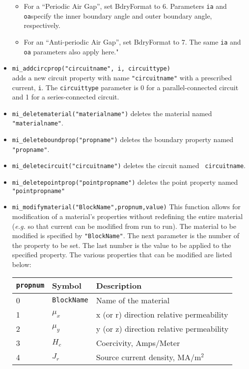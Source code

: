 \begin{itemize}
\begin{itemize}
        \item  For a ``Periodic Air Gap'', set BdryFormat to 6. Parameters {\tt ia} and {\tt oa}specify the inner boundary angle and outer boundary angle, respectively.

        \item  For an ``Anti-periodic Air Gap'', set BdryFormat to 7.  The same  {\tt ia} and {\tt oa} parameters also apply here."

        \end{itemize}

\item{\tt mi\_addcircprop("circuitname", i, circuittype)} \\
adds a new circuit property with name {\tt "circuitname"} with a prescribed current, {\tt i}.
The {\tt circuittype} parameter is 0 for a parallel-connected circuit and 1 for a
series-connected circuit.
\item{\tt mi\_deletematerial("materialname")} deletes the material named {\tt
"materialname"}.
\item{\tt mi\_deleteboundprop("propname")} deletes the boundary property named
{\tt "propname"}.
\item{\tt mi\_deletecircuit("circuitname")} deletes the circuit named {\tt
circuitname}.
\item{\tt mi\_deletepointprop("pointpropname")} deletes the point property named
{\tt "pointpropname"}
\item{\verb+mi_modifymaterial("BlockName",propnum,value)+} This
function allows for modification of a material's properties without
redefining the entire material ({\em e.g.} so that current can be
modified from run to run).  The material to be modified is
specified by {\tt "BlockName"}.  The next parameter is the number
of the property to be set. The last number is the value to be
applied to the specified property.  The various properties that can
be modified are listed below:
\begin{center}
\begin{tabular}{lll} \hline
{\tt propnum}& Symbol & Description \\ \hline
 0 & {\tt BlockName} & Name of the material \\
 1 & $\mu_x$ & x (or r) direction relative permeability \\
 2 & $\mu_y$ & y (or z) direction relative permeability \\
 3 & $H_c$   & Coercivity, Amps/Meter \\
 4 & $J_r$   & Source current density, MA/m$^2$ \\

\end{tabular}
\end{center}
\end{itemize}
